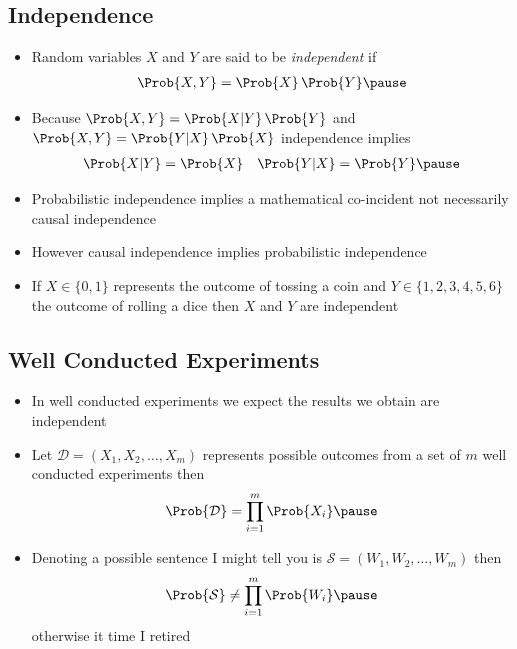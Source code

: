 \begin{slide}
\section[-2]{Independence}

\begin{PauseHighLight}
  \begin{itemize}\squeeze
  \item Random variables $X$ and $Y$ are said to be \emph{independent} if
    \begin{align*}
      \Prob{X, Y} = \Prob{X}\,\Prob{Y}\pause
    \end{align*}
  \item Because $\Prob{X,Y}= \Prob{X|Y}\,\Prob{Y}$ and $\Prob{X,Y}=
    \Prob{Y|X}\,\Prob{X}$ independence implies
    \begin{align*}
      \Prob{X|Y} &= \Prob{X} & \Prob{Y|X} = \Prob{Y}\pause
    \end{align*}
  \item Probabilistic independence implies a mathematical co-incident not
    necessarily causal independence\pause
  \item However causal independence implies probabilistic
    independence\pause
  \item If $X\in\{0,1\}$ represents the outcome of tossing a coin and
    $Y\in\{1,2,3,4,5,6\}$ the outcome of rolling a dice then $X$ and $Y$
    are independent\pause
  \end{itemize}
\end{PauseHighLight}
\end{slide}


\begin{slide}
\section[-2]{Well Conducted Experiments}

\begin{PauseHighLight}
  \begin{itemize}\squeeze
  \item In well conducted experiments we expect the results we obtain
    are independent\pause
  \item Let $\mathcal{D} = (X_1, X_2, \ldots, X_m)$ represents
    possible outcomes from a set of $m$ well conducted
    experiments then
    \begin{align*}
      \Prob{\mathcal{D}} = \prod_{i=1}^m \Prob{X_i}\pause
     \end{align*}
   \item Denoting a possible sentence I might tell you is
     $\mathcal{S}=(W_1, W_2,\ldots,W_m)$ then
     \begin{align*}
       \Prob{\mathcal{S}} \neq  \prod_{i=1}^m \Prob{W_i}\pause
     \end{align*}
     otherwise it time I retired\pauseb
  \end{itemize}
\end{PauseHighLight}

\end{slide}

